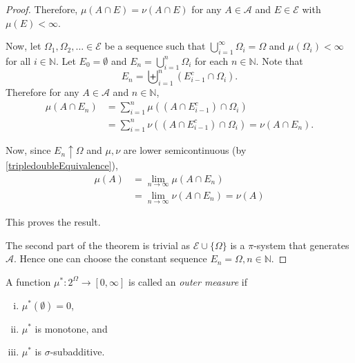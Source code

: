 \begin{proof}
    Therefore, $\mu(A\cap E)=\nu(A\cap E)$ for any $A\in\mathcal{A}$ and $E\in\mathcal{E}$ with $\mu(E)<\infty$.
    
    Now, let $\Omega_1,\Omega_2,\ldots\in\mathcal{E}$ be a sequence such that $\bigcup_{i=1}^\infty\Omega_i=\Omega$ and $\mu(\Omega_i)<\infty$ for all $i\in\mathbb{N}$. Let $E_0=\emptyset$ and $E_n=\bigcup_{i=1}^n\Omega_i$ for each $n\in\mathbb{N}$. Note that
    $$E_n=\biguplus_{i=1}^n(E_{i-1}^c\cap \Omega_i).$$
    Therefore for any $A\in\mathcal{A}$ and $n\in\mathbb{N}$,
    \begin{align*}
        \mu(A\cap E_n) &= \sum_{i=1}^n\mu((A\cap E_{i-1}^c)\cap\Omega_i) \\
        &= \sum_{i=1}^n\nu((A\cap E_{i-1}^c)\cap\Omega_i) = \nu(A\cap E_n).
    \end{align*}
    
    Now, since $E_n\uparrow\Omega$ and $\mu,\nu$ are lower semicontinuous (by \cref{tripledoubleEquivalence}),
    \begin{align*}
        \mu(A) &= \lim_{n\to\infty}\mu(A\cap E_n) \\
        &= \lim_{n\to\infty}\nu(A\cap E_n) = \nu(A)
    \end{align*}
    
    This proves the result.
    
    \vspace{2mm}
    The second part of the theorem is trivial as $\mathcal{E}\cup\{\Omega\}$ is a $\pi$-system that generates $\mathcal{A}$. Hence one can choose the constant sequence $E_n=\Omega, n\in\mathbb{N}$.
\end{proof}

\begin{definition}
    A function $\mu^*:2^\Omega\to[0,\infty]$ is called an \textit{outer measure} if
    \begin{enumerate}[(i)]
        \item $\mu^*(\emptyset)=0$,
        \item $\mu^*$ is monotone, and
        \item $\mu^*$ is $\sigma$-subadditive.
    \end{enumerate}
\end{definition}

